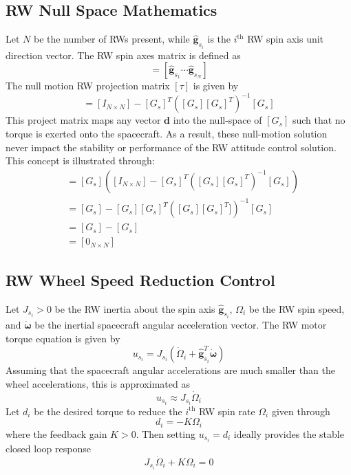 \subsection{RW Null Space Mathematics}
Let $N$ be the number of RWs present, while $\hat{\bm g}_{s_{i}}$ is the $i^{\text{th}}$ RW spin axis unit direction vector.  The RW spin axes matrix is defined as
\begin{equation}
	[G_{s}] = [\hat{\bm g}_{s_{1}} \cdots \hat{\bm g}_{s_{N}}]
\end{equation}
The null motion RW projection matrix $[\tau]$ is given by\cite{schaub}
\begin{equation}
	[\tau] = [I_{N\times N}] - [G_{s}]^{T} \left( [G_{s}] [G_{s}]^{T} \right)^{-1} [G_{s}]
\end{equation}
This project matrix maps any vector $\bm d$ into the null-space of $[G_{s}]$ such that no torque is exerted onto the spacecraft.  As a result, these null-motion solution never impact the stability or performance of the RW attitude control solution.  This concept is illustrated through:
\begin{align*}
	[G_{s}] [\tau] &= [G_{s}] \left( [I_{N\times N}] - [G_{s}]^{T} \left( [G_{s}] [G_{s}]^{T} \right)^{-1} [G_{s}] \right)
	\\
	&= [G_{s}] - [G_{s}] [G_{s}]^{T} \left( [G_{s}] [G_{s}]^{T}] \right)^{-1} [G_{s}] \\
	&= [G_{s}] - [G_{s}] \\
	&= [0_{N\times N}]
\end{align*}


\subsection{RW Wheel Speed Reduction Control}
Let $J_{s_{i}}>0$ be the RW inertia about the spin axis $\hat{\bm g}_{s_{i}}$, $\Omega_{i}$ be the RW spin speed, and $\dot{\bm \omega}$ be the inertial spacecraft angular acceleration vector.  The RW motor torque equation is given by\cite{schaub}
\begin{equation}
	u_{s_{i}} = J_{s_{i}} (\dot\Omega_{i} + \hat{\bm g}_{s_{i}}^{T} \dot{\bm \omega} )
\end{equation}
Assuming that the spacecraft angular accelerations are much smaller than the wheel accelerations, this is approximated as
\begin{equation}
	u_{s_{i}} \approx J_{s_{i}} \dot\Omega_{i}
\end{equation}
Let $d_{i}$ be the desired torque to reduce the $i^{\text{th}}$ RW spin rate $\Omega_{i}$ given through
\begin{equation}
	d_{i} = - K \Omega_{i}
\end{equation}
where the feedback gain $K>0$.  Then setting $u_{s_{i}} = d_{i}$ ideally provides the stable closed loop response
\begin{equation}
	J_{s_{i}} \dot\Omega_{i} + K\Omega_{i} = 0
\end{equation}



